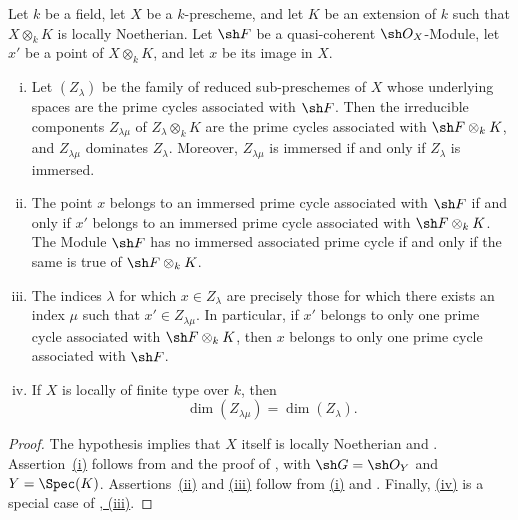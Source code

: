 \begin{proposition}[4.2.7]
\label{IV.4.2.7}
Let $k$ be a field, let $X$ be a $k$-prescheme, and let $K$ be an
extension of $k$ such that $X\otimes_k K$ is locally Noetherian.
Let $\sh F$ be a quasi-coherent $\sh O_X$-Module, let $x'$ be a point
of $X\otimes_k K$, and let $x$ be its image in $X$.
\begin{enumerate}[(i)]
\item
{}
\label{IV.4.2.7.i}
Let $(Z_\lambda)$ be the family of reduced sub-preschemes of $X$ whose
underlying spaces are the prime cycles associated with $\sh F$.
Then the irreducible components $Z_{\lambda\mu}$ of
$Z_\lambda\otimes_k K$ are the prime cycles associated with
$\sh F\otimes_k K$, and $Z_{\lambda\mu}$ dominates $Z_\lambda$.
Moreover, $Z_{\lambda\mu}$ is immersed if and only if $Z_\lambda$ is
immersed.

\item
{}
\label{IV.4.2.7.ii}
The point $x$ belongs to an immersed prime cycle associated with
$\sh F$ if and only if $x'$ belongs to an immersed prime cycle
associated with $\sh F\otimes_k K$.
The Module $\sh F$ has no immersed associated prime cycle if and only if
the same is true of $\sh F\otimes_k K$.


\item
{}
\label{IV.4.2.7.iii}
The indices $\lambda$ for which $x\in Z_\lambda$ are precisely those for
which there exists an index $\mu$ such that
$x'\in Z_{\lambda\mu}$.
In particular, if $x'$ belongs to only one prime cycle associated with
$\sh F\otimes_k K$, then $x$ belongs to only one prime cycle associated
with $\sh F$.

\item
{}
\label{IV.4.2.7.iv}
If $X$ is locally of finite type over $k$, then
\[
\dim(Z_{\lambda\mu})=\dim(Z_\lambda).
\]
\end{enumerate}
\end{proposition}

\begin{proof}
The hypothesis implies that $X$ itself is locally Noetherian
 and .
Assertion~{\hyperlink{ega4.c04.sec.4-2-7-i}{(i)}} follows from
 and the proof of , with
$\sh G=\sh O_Y$ and $Y=\Spec(K)$.
Assertions~{\hyperlink{ega4.c04.sec.4-2-7-ii}{(ii)}} and
{\hyperlink{ega4.c04.sec.4-2-7-iii}{(iii)}} follow from
{\hyperlink{ega4.c04.sec.4-2-7-i}{(i)}} and .
Finally, {\hyperlink{ega4.c04.sec.4-2-7-iv}{(iv)}} is a special case of
{\hyperlink{ega4.c04.sec.4-2-4-iii}{, (iii)}}.
\end{proof}

